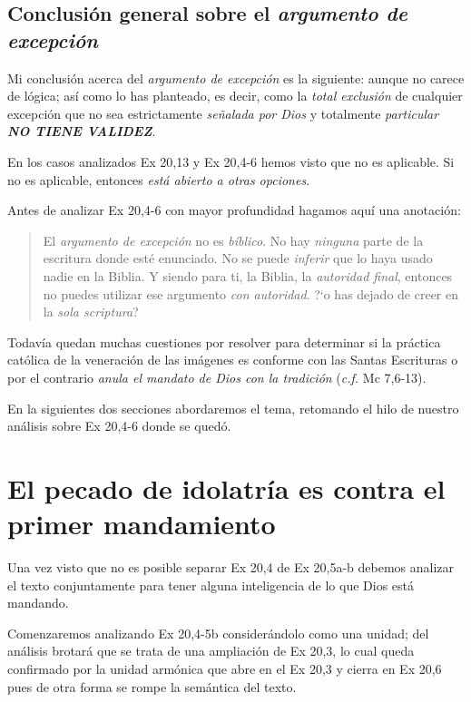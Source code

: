 \documentclass{article}
\begin{document}
\subsection{Conclusi\'on general sobre el \emph{argumento de excepci\'on}}

Mi conclusi\'on acerca del \emph{argumento de excepci\'on} es la siguiente: aunque no carece de l\'ogica; as\'{i} como lo has planteado, es decir, como la \emph{total exclusi\'on} de cualquier excepci\'on que no sea estrictamente \emph{se\~nalada por Dios} y totalmente \emph{particular} \textbf{\emph{NO TIENE VALIDEZ}}.

En los casos analizados Ex 20,13 y Ex 20,4-6 hemos visto que no es aplicable. Si no es aplicable, entonces \emph{est\'a abierto a otras opciones}.

Antes de analizar Ex 20,4-6 con mayor profundidad hagamos aqu\'{i} una anotaci\'on:

\begin{quote}
El \emph{argumento de excepci\'on} no es \emph{b\'{i}blico}. No hay \emph{ninguna} parte de la escritura donde est\'e enunciado. No se puede \emph{inferir} que lo haya usado nadie en la Biblia. Y siendo para ti, la Biblia, la \emph{autoridad final}, entonces no puedes utilizar ese argumento \emph{con autoridad}. ?`o has dejado de creer en la \emph{sola scriptura}?
\end{quote}

\noindent
Todav\'{i}a quedan muchas cuestiones por resolver para determinar si la pr\'actica cat\'olica de la veneraci\'on de las im\'agenes es conforme con las Santas Escrituras o por el contrario \emph{anula el mandato de Dios con la tradici\'on} (\emph{c.f.} Mc 7,6-13).

En la siguientes dos secciones abordaremos el tema, retomando el hilo de nuestro an\'alisis sobre Ex 20,4-6 donde se qued\'o.

\section{El pecado de idolatr\'{i}a es contra el primer mandamiento}

Una vez visto que no es posible separar Ex 20,4 de Ex 20,5a-b debemos analizar el texto conjuntamente para tener alguna inteligencia de lo que Dios est\'a mandando.

Comenzaremos analizando Ex 20,4-5b consider\'andolo como una unidad; del an\'alisis brotar\'a que se trata de una ampliaci\'on de Ex 20,3, lo cual queda confirmado por la unidad arm\'onica que abre en el Ex 20,3 y cierra en Ex 20,6 pues de otra forma se rompe la sem\'antica del texto.
\end{document}
